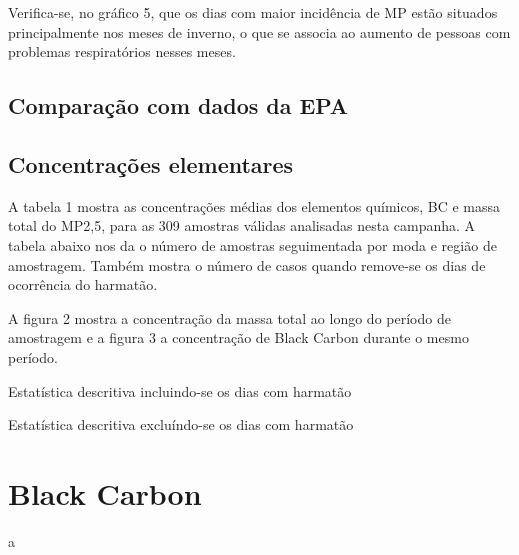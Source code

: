 Verifica-se, no gráfico 5, que os dias com maior incidência de MP estão situados principalmente nos meses de inverno, o que se associa ao aumento de pessoas com problemas respiratórios nesses meses.



\subsection{Comparação com dados da EPA}


\subsection{Concentrações elementares}

A tabela 1 mostra as concentrações médias dos elementos químicos, 
BC e massa total do MP2,5, para as 309 amostras válidas analisadas nesta campanha.
A tabela abaixo nos da o número de amostras seguimentada por
moda e região de amostragem. 
Também mostra o número de casos quando remove-se os dias de ocorrência do harmatão.

A figura 2 mostra a concentração da massa total ao longo do período de amostragem e a figura 3 a concentração de Black Carbon durante o mesmo período.

\begin{table}[H]
 \centering
  
  \caption{Estatística descritiva incluindo-se os dias com harmatão}
\end{table}

\begin{table}[H]
  \centering
  
  \caption{Estatística descritiva excluíndo-se os dias com harmatão}
\end{table}

\section{Black Carbon}
a


